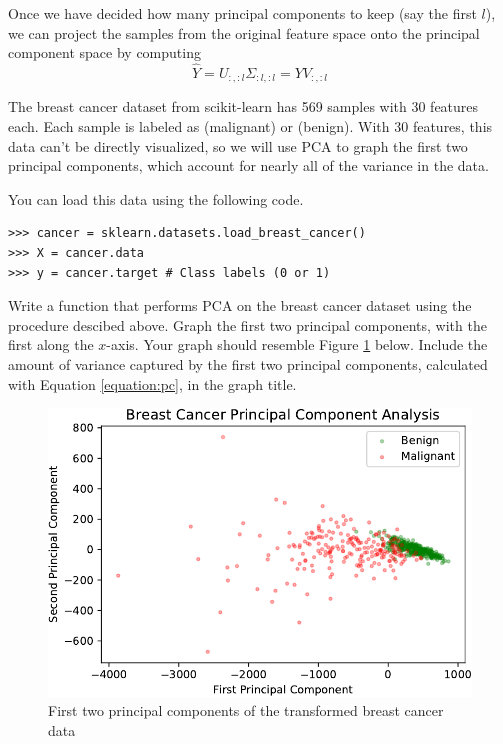 Once we have decided how many principal components to keep (say the first $l$), we can project the samples from the original feature space onto the principal component space by computing
\begin{equation*}
\widehat{Y} = U_{:,:l}\Sigma_{:l,:l} = YV_{:,:l}
\end{equation*}

\begin{problem}%
The breast cancer dataset from scikit-learn has 569 samples with 30 features each.
Each sample is labeled as  (malignant) or  (benign).
With 30 features, this data can't be directly visualized, so we will use PCA to graph the first two principal components, which account for nearly all of the variance in the data.

You can load this data using the following code.

\begin{lstlisting}
>>> cancer = sklearn.datasets.load_breast_cancer()
>>> X = cancer.data
>>> y = cancer.target # Class labels (0 or 1)
\end{lstlisting}

Write a function that performs PCA on the breast cancer dataset using the procedure descibed above.
Graph the first two principal components, with the first along the $x$-axis.
Your graph should resemble Figure \ref{fig:cancer} below.
Include the amount of variance captured by the first two principal components, calculated with Equation \ref{equation:pc}, in the graph title.
\label{problem:cancer}
\end{problem}

\begin{figure}[H]
\includegraphics[width=.7\textwidth]{figures/cancer.pdf}
\caption{First two principal components of the transformed breast cancer data}
\label{fig:cancer}
\end{figure}

